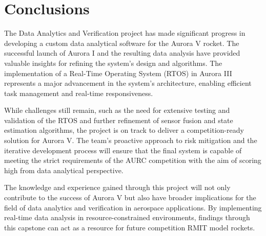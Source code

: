 \section{Conclusions}
The Data Analytics and Verification project has made significant progress in developing a custom data analytical software for the Aurora V rocket. The successful launch of Aurora I and the resulting data analysis have provided valuable insights for refining the system's design and algorithms. The implementation of a Real-Time Operating System (RTOS) in Aurora III represents a major advancement in the system's architecture, enabling efficient task management and real-time responsiveness. 

While challenges still remain, such as the need for extensive testing and validation of the RTOS and further refinement of sensor fusion and state estimation algorithms, the project is on track to deliver a competition-ready solution for Aurora V. The team's proactive approach to risk mitigation and the iterative development process will ensure that the final system is capable of meeting the strict requirements of the AURC competition with the aim of scoring high from data analytical perspective. 

The knowledge and experience gained through this project will not only contribute to the success of Aurora V but also have broader implications for the field of data analytics and verification in aerospace applications. By implementing real-time data analysis in resource-constrained environments, findings through this capstone can act as a resource for future competition RMIT model rockets.  
